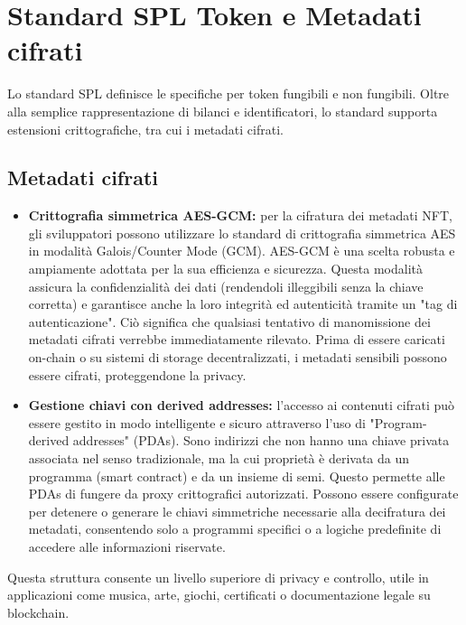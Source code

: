 \documentclass[a4paper,12pt]{report}
\begin{document}
	\section{Standard SPL Token e Metadati cifrati}
	Lo standard SPL definisce le specifiche per token fungibili e non fungibili. Oltre alla semplice rappresentazione di bilanci e identificatori, lo standard supporta estensioni crittografiche, tra cui i metadati cifrati.
	
	\subsection{Metadati cifrati}
	\begin{itemize}
		\item \textbf{Crittografia simmetrica AES-GCM:} per la cifratura dei metadati NFT, gli sviluppatori possono utilizzare lo standard di crittografia simmetrica AES in modalità Galois/Counter Mode (GCM). AES-GCM è una scelta robusta e ampiamente adottata per la sua efficienza e sicurezza. Questa modalità assicura la confidenzialità dei dati (rendendoli illeggibili senza la chiave corretta) e garantisce anche la loro integrità ed autenticità tramite un "tag di autenticazione". Ciò significa che qualsiasi tentativo di manomissione dei metadati cifrati verrebbe immediatamente rilevato. Prima di essere caricati on-chain o su sistemi di storage decentralizzati, i metadati sensibili possono essere cifrati, proteggendone la privacy.
		\item \textbf{Gestione chiavi con derived addresses:} l’accesso ai contenuti cifrati può essere gestito in modo intelligente e sicuro attraverso l'uso di "Program-derived addresses" (PDAs). Sono indirizzi che non hanno una chiave privata associata nel senso tradizionale, ma la cui proprietà è derivata da un programma (smart contract) e da un insieme di semi. Questo permette alle PDAs di fungere da proxy crittografici autorizzati. Possono essere configurate per detenere o generare le chiavi simmetriche necessarie alla decifratura dei metadati, consentendo solo a programmi specifici o a logiche predefinite di accedere alle informazioni riservate.
	\end{itemize}
	Questa struttura consente un livello superiore di privacy e controllo, utile in applicazioni come musica, arte, giochi, certificati o documentazione legale su blockchain.
	
\end{document}
